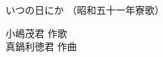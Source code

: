 \documentclass[10pt,b5j]{tarticle} %
\begin{document}
\begin{minipage}[c]{0.7\hsize} %
    \begin{center}
        {\LARGE
            いつの日にか %
        }
        {\small 
            （昭和五十一年寮歌） %
        }
    \end{center}
\end{minipage}
\begin{minipage}[c]{0.3\hsize} %
    \begin{flushright} %
        小嶋茂君 作歌\\真鍋利徳君 作曲 %
    \end{flushright}
\end{minipage}
\end{document}
